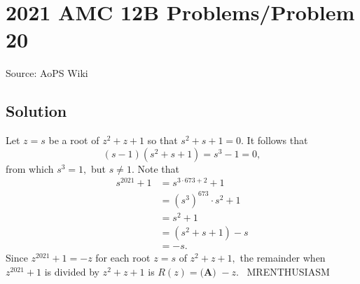 \documentclass[12pt]{article}
\begin{document}
\section*{{2021 AMC 12B Problems/Problem 20}}
Source: AoPS Wiki

\subsection*{Solution}
Let $z=s$ be a root of $z^2+z+1$ so that $s^2+s+1=0.$ It follows that \[(s-1)\left(s^2+s+1\right)=s^3-1=0,\] from which $s^3=1,$ but $s\neq1.$ Note that \begin{align*} s^{2021}+1 &= s^{3\cdot673+2}+1 \\ &= (s^3)^{673}\cdot s^2+1 \\ &= s^2+1 \\ &= \left(s^2+s+1\right)-s \\ &= -s. \end{align*} Since $z^{2021}+1=-z$ for each root $z=s$ of $z^2+z+1,$ the remainder when $z^{2021}+1$ is divided by $z^2+z+1$ is $R(z)=\boxed{\textbf{(A) }{-}z}.$ ~MRENTHUSIASM
\end{document}
